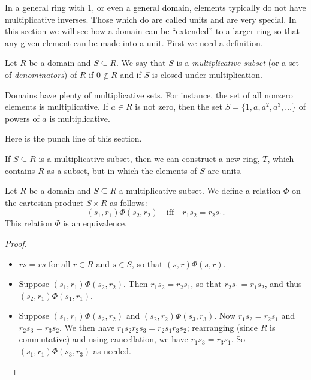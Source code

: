 In a general ring with 1, or even a general domain, elements typically do not have multiplicative inverses. Those which do are called units and are very special. In this section we will see how a domain can be ``extended'' to a larger ring so that any given element can be made into a unit. First we need a definition.

\begin{dfn} \label{dfn:multiplicative-subset}
Let \(R\) be a domain and \(S \subseteq R\). We say that \(S\) is a \emph{multiplicative subset} (or a set of \emph{denominators}) of \(R\) if \(0 \notin R\) and if \(S\) is closed under multiplication. 
\end{dfn}

Domains have plenty of multiplicative sets. For instance, the set of all nonzero elements is multiplicative. If \(a \in R\) is not zero, then the set \(S = \{ 1, a, a^2, a^3, \ldots \}\) of powers of \(a\) is multiplicative.

Here is the punch line of this section.

\begin{framed}
If \(S \subseteq R\) is a multiplicative subset, then we can construct a new ring, \(T\), which contains \(R\) as a subset, but in which the elements of \(S\) are units.
\end{framed}

\begin{prop}
Let \(R\) be a domain and \(S \subseteq R\) a multiplicative subset. We define a relation \(\Phi\) on the cartesian product \(S \times R\) as follows: \[ (s_1, r_1) \Phi (s_2, r_2) \quad \mathrm{iff} \quad r_1s_2 = r_2s_1. \]
This relation \(\Phi\) is an equivalence.
\end{prop}

\begin{proof} \mbox{}
\begin{itemize}
\item \(rs = rs\) for all \(r \in R\) and \(s \in S\), so that \((s,r) \Phi (s,r)\).
\item Suppose \((s_1,r_1) \Phi (s_2,r_2)\). Then \(r_1s_2 = r_2s_1\), so that \(r_2s_1 = r_1s_2\), and thus \((s_2,r_1) \Phi (s_1,r_1)\).
\item Suppose \((s_1, r_1) \Phi (s_2, r_2)\) and \((s_2, r_2) \Phi (s_3, r_3)\). Now \(r_1s_2 = r_2s_1\) and \(r_2s_3 = r_3s_2\). We then have \(r_1s_2r_2s_3 = r_2s_1r_3s_2\); rearranging (since \(R\) is commutative) and using cancellation, we have \(r_1s_3 = r_3s_1\). So \((s_1, r_1) \Phi (s_3, r_3)\) as needed. \qedhere
\end{itemize}
\end{proof}

